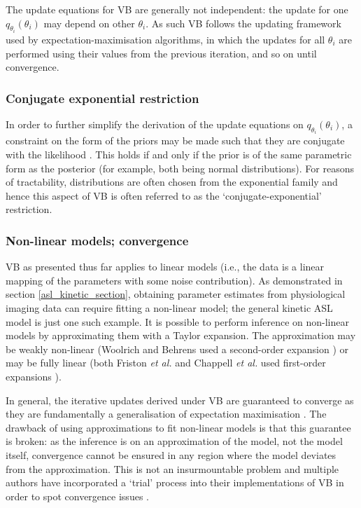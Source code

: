 The update equations for VB are generally not independent: the update for one $q_{\theta_i}(\theta_i)$ may depend on other $\theta_i$. As such VB follows the updating framework used by expectation-maximisation algorithms, in which the updates for all $\theta_i$ are performed using their values from the previous iteration, and so on until convergence.

\subsubsection{Conjugate exponential restriction}

In order to further simplify the derivation of the update equations on $q_{\theta_i}(\theta_i)$, a constraint on the form of the priors may be made such that they are conjugate with the likelihood \cite{Chappell2009}. This holds if and only if the prior is of the same parametric form as the posterior (for example, both being normal distributions). For reasons of tractability, distributions are often chosen from the exponential family and hence this aspect of VB is often referred to as the `conjugate-exponential' restriction. 

\subsubsection{Non-linear models; convergence}

VB as presented thus far applies to linear models (i.e., the data is a linear mapping of the parameters with some noise contribution). As demonstrated in section \ref{asl_kinetic_section}, obtaining parameter estimates from physiological imaging data can require fitting a non-linear model; the general kinetic ASL model is just one such example. It is possible to perform inference on non-linear models by approximating them with a Taylor expansion. The approximation may be weakly non-linear (Woolrich and Behrens used a second-order expansion \cite{Woolrich2006}) or may be fully linear (both Friston \textit{et al.} and Chappell \textit{et al.} used first-order expansions \cite{Chappell2009, Friston2007}). 

In general, the iterative updates derived under VB are guaranteed to converge as they are fundamentally a generalisation of expectation maximisation \cite{Attias2000}. The drawback of using approximations to fit non-linear models is that this guarantee is broken: as the inference is on an approximation of the model, not the model itself, convergence cannot be ensured in any region where the model deviates from the approximation. This is not an insurmountable problem and multiple authors have incorporated a `trial' process into their implementations of VB in order to spot convergence issues \cite{Chappell2009, Friston2007}. 

